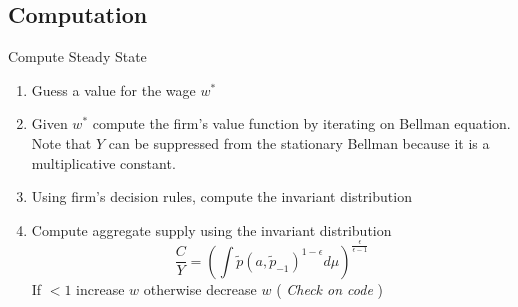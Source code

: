 \documentclass[a4paper,10pt]{article}  %
\begin{document}
\subsection{Computation} %
\label{sub:computation}

Compute Steady State
\begin{enumerate}
   
   \item Guess a value for the wage $ w^* $
   \item Given $ w^* $ compute the firm's value function by iterating on Bellman equation. 
   Note that $ Y $ can be suppressed from the stationary Bellman because it is a multiplicative
   constant. 
   \item Using firm's decision rules, compute the invariant distribution
   \item Compute aggregate supply using the invariant distribution 
   \[
      \frac{C}{Y} = \left( \int  \tilde{p}(a,\tilde{p}_{-1})^{1 -\epsilon} d\mu \right)^{ \frac{\epsilon}{\epsilon-1} }
   \]
   If $ <1 $ increase $ w $ otherwise decrease $ w $ ( {\em \color{blue} Check on code} )
\end{enumerate}




\clearpage
\newpage
% 
% 

% 
\end{document}
